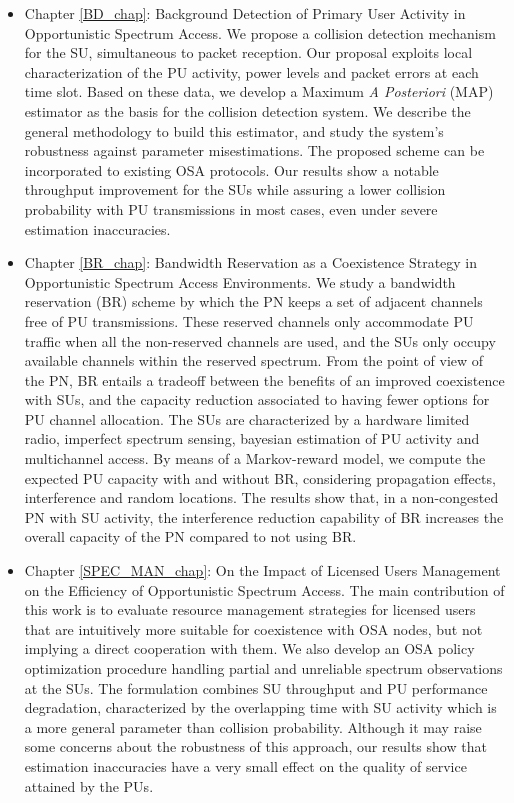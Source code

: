\begin{itemize}
\item Chapter \ref{BD_chap}: Background Detection of Primary User Activity in Opportunistic Spectrum Access. 
We propose a collision detection mechanism for the SU, simultaneous to packet reception. 
Our proposal exploits local characterization of the PU activity, power levels and packet errors at each time slot. 
Based on these data, we develop a Maximum \textit{A Posteriori} (MAP) estimator as the basis for the collision detection system. We describe the general methodology to build this estimator, and study the system's robustness against parameter misestimations. 
The proposed scheme can be incorporated to existing OSA protocols. 
Our results show a notable throughput improvement for the SUs while assuring a lower collision probability with PU transmissions in most cases, even under severe estimation inaccuracies.


\item Chapter \ref{BR_chap}: Bandwidth Reservation as a Coexistence Strategy in Opportunistic Spectrum Access Environments. We study a bandwidth reservation (BR) scheme by which the PN keeps a set of adjacent channels free of PU transmissions. 
These reserved channels only accommodate PU traffic when all the non-reserved channels are used, and the SUs only occupy available channels within the reserved spectrum.
From the point of view of the PN, BR entails a tradeoff between the benefits of an improved coexistence with SUs, and the capacity reduction associated to having fewer options for PU channel allocation.
The SUs are characterized by a hardware limited radio, imperfect spectrum sensing, bayesian estimation of PU activity and multichannel access. 
By means of a Markov-reward model, we compute the expected PU capacity with and without BR, considering propagation effects, interference and random locations.
The results show that, in a non-congested PN with SU activity, the interference reduction capability of BR increases the overall capacity of the PN compared to not using BR.

\item Chapter \ref{SPEC_MAN_chap}: On the Impact of Licensed Users Management on the Efficiency of Opportunistic Spectrum Access.
The main contribution of this work is to evaluate resource management strategies for licensed users that are intuitively more suitable for coexistence with OSA nodes, but not implying a direct cooperation with them.
We also develop an OSA policy optimization procedure handling partial and unreliable spectrum observations at the SUs.
The formulation combines SU throughput and PU performance degradation, characterized by the overlapping time with SU activity which is a more general parameter than collision probability.    
Although it may raise some concerns about the robustness of this approach, our results show that estimation inaccuracies have a very small effect on the quality of service attained by the PUs.


\end{itemize}
